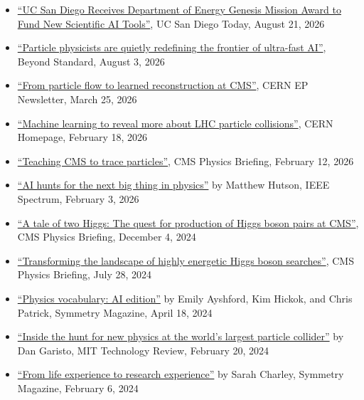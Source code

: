 \documentclass[11pt]{res}
\begin{document}
\begin{resume}
  \begin{itemize}
    \itemsep-0.3em
    \item \href{https://today.ucsd.edu/story/genesis-mission-to-fund-new-scientific-ai-tools}{``UC San Diego Receives Department of Energy Genesis Mission Award to Fund New Scientific AI Tools''}, UC San Diego Today, August 21, 2026
    \item \href{https://beyondstandard.org/articles/particle-physicists-are-quietly-redefining-the-frontier-of-ultra-fast-ai/}{``Particle physicists are quietly redefining the frontier of ultra-fast AI''}, Beyond Standard, August 3, 2026
    \item \href{https://ep-news.web.cern.ch/content/particle-flow-learned-reconstruction-cms}{``From particle flow to learned reconstruction at CMS''}, CERN EP Newsletter, March 25, 2026
    \item \href{https://home.cern/news/news/physics/machine-learning-reveal-more-about-lhc-particle-collisions}{``Machine learning to reveal more about LHC particle collisions''}, CERN Homepage, February 18, 2026
    \item \href{https://cms.cern/news/teaching-cms-trace-particles}{``Teaching CMS to trace particles''}, CMS Physics Briefing, February 12, 2026
    \item \href{https://spectrum.ieee.org/particle-physics-ai}{``AI hunts for the next big thing in physics''} by Matthew Hutson, IEEE Spectrum, February 3, 2026
    \item \href{https://cms.cern/news/tale-two-higgs-quest-production-higgs-boson-pairs-cms}{``A tale of two Higgs: The quest for production of Higgs boson pairs at CMS''}, CMS Physics Briefing, December 4, 2024
    \item \href{https://cms.cern/news/transforming-landscape-highly-energetic-higgs-boson-searches}{``Transforming the landscape of highly energetic Higgs boson searches''}, CMS Physics Briefing, July 28, 2024
    \item \href{https://www.symmetrymagazine.org/article/physics-vocabulary-ai-edition}{``Physics vocabulary: AI edition''} by Emily Ayshford, Kim Hickok, and Chris Patrick, Symmetry Magazine, April 18, 2024
    \item \href{https://www.technologyreview.com/2024/02/20/1088002/higgs-boson-physics-particle-collider-large-hadron-collider/}{``Inside the hunt for new physics at the world's largest particle collider''} by Dan Garisto, MIT Technology Review, February 20, 2024
    \item \href{https://www.symmetrymagazine.org/article/from-life-experience-to-research-experience}{``From life experience to research experience''} by Sarah Charley, Symmetry Magazine, February 6, 2024

\end{itemize}
\end{resume}
\end{document}
